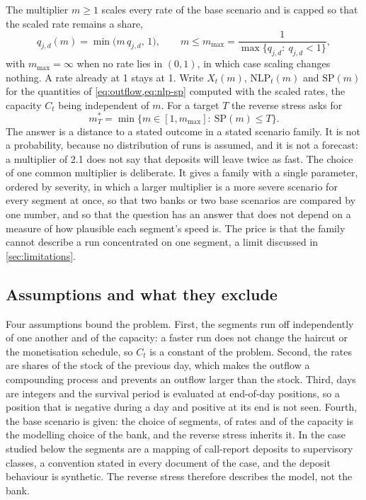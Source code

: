 The multiplier $m\ge 1$ scales every rate of the base scenario and is capped so that the scaled rate remains a share,
\begin{equation}
q_{j,d}(m)=\min\bigl(m\,q_{j,d},\,1\bigr),\qquad m\le m_{\max}=\frac{1}{\max\{q_{j,d}:\ q_{j,d}<1\}},
\label{eq:scaled}
\end{equation}
with $m_{\max}=\infty$ when no rate lies in $(0,1)$, in which case scaling changes nothing. A rate already at 1 stays at 1. Write $X_t(m)$, $\mathrm{NLP}_t(m)$ and $\mathrm{SP}(m)$ for the quantities of \cref{eq:outflow,eq:nlp-sp} computed with the scaled rates, the capacity $C_t$ being independent of $m$. For a target $T$ the reverse stress asks for
\begin{equation}
m^\ast_T=\min\{m\in[1,m_{\max}]:\ \mathrm{SP}(m)\le T\}.
\label{eq:reverse}
\end{equation}
The answer is a distance to a stated outcome in a stated scenario family. It is not a probability, because no distribution of runs is assumed, and it is not a forecast: a multiplier of 2.1 does not say that deposits will leave twice as fast. The choice of one common multiplier is deliberate. It gives a family with a single parameter, ordered by severity, in which a larger multiplier is a more severe scenario for every segment at once, so that two banks or two base scenarios are compared by one number, and so that the question has an answer that does not depend on a measure of how plausible each segment's speed is. The price is that the family cannot describe a run concentrated on one segment, a limit discussed in \cref{sec:limitations}.

\subsection{Assumptions and what they exclude}

Four assumptions bound the problem. First, the segments run off independently of one another and of the capacity: a faster run does not change the haircut or the monetisation schedule, so $C_t$ is a constant of the problem. Second, the rates are shares of the stock of the previous day, which makes the outflow a compounding process and prevents an outflow larger than the stock. Third, days are integers and the survival period is evaluated at end-of-day positions, so a position that is negative during a day and positive at its end is not seen. Fourth, the base scenario is given: the choice of segments, of rates and of the capacity is the modelling choice of the bank, and the reverse stress inherits it. In the case studied below the segments are a mapping of call-report deposits to supervisory classes, a convention stated in every document of the case, and the deposit behaviour is synthetic. The reverse stress therefore describes the model, not the bank.

